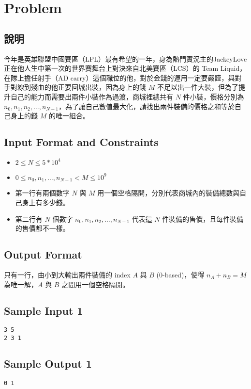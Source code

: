 \documentclass[12pt]{article}
\title{\mytitle}
\author{\textbf{\myauthor}}
\date{Due: 2025/9/17}
\begin{document}
\onehalfspacing
\maketitle

\section{Problem}
\subsection{說明}
今年是英雄聯盟中國賽區（LPL）最有希望的一年，身為熱門實況主的JackeyLove正在他人生中第一次的世界賽舞台上對決來自北美賽區（LCS）的 Team Liquid，在隊上擔任射手（AD carry）這個職位的他，對於金錢的運用一定要嚴謹，與對手對線到殘血的他正要回城出裝，因為身上的錢 $M$ 不足以出一件大裝，但為了提升自己的能力而需要出兩件小裝作為過渡，商城裡總共有 $N$ 件小裝，價格分別為 $n_0,n_1,n_2,\dots,n_{N-1}$，為了讓自己數值最大化，請找出兩件裝備的價格之和等於自己身上的錢 $M$ 的唯一組合。
\subsection{Input Format and Constraints}
\begin{itemize}
    \item $2 \le N \le 5*10^4$
    \item $0\le n_0,n_1,\dots,n_{N-1} < M\le10^9$
    \item 第一行有兩個數字 $N$ 與 $M$ 用一個空格隔開，分別代表商城內的裝備總數與自己身上有多少錢。
    \item 第二行有 $N$ 個數字 $n_0,n_1,n_2,\dots,n_{N-1}$ 代表這 $N$ 件裝備的售價，且每件裝備的售價都不一樣。
\end{itemize}
\subsection{Output Format}
只有一行，由小到大輸出兩件裝備的 index $A$ 與 $B$ (0-based)，使得 $n_A+n_B=M$  為唯一解，$A$ 與 $B$ 之間用一個空格隔開。
\subsection{Sample Input 1}
\begin{verbatim}    
3 5
2 3 1
\end{verbatim}
\subsection{Sample Output 1}
\begin{verbatim}
0 1
\end{verbatim}
\end{document}
